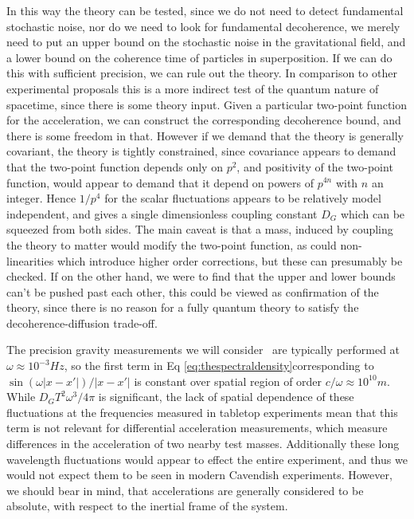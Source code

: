 \documentclass[aps,preprintnumbers,superscriptaddress,longbibliography]{revtex4-1}
\begin{document}
 In this way the theory can be tested, since we do not need to detect fundamental stochastic noise, nor do we need to look for fundamental decoherence, we merely need to put an upper bound on the stochastic noise in the gravitational field, and a lower bound on the coherence time of particles in superposition. If we can do this with sufficient precision, we can rule out the theory.
In comparison to other experimental proposals\cite{bose2017spin,marletto2017gravitationally} this is a more indirect test of the quantum nature of spacetime, since there is some theory input.
Given a particular two-point function for the acceleration, we can construct the corresponding decoherence bound, and there is some freedom in that. However if we demand that the theory is generally covariant, the theory is tightly constrained, since covariance appears to demand that the two-point function depends only on $p^2$, and positivity of the two-point function, would appear to demand that it depend on powers of $p^{4n}$ with $n$ an integer. Hence $1/p^4$ for the scalar fluctuations appears to be relatively model independent, and gives a single dimensionless coupling constant $D_G$ which can be squeezed from both sides. The main caveat is that a mass, induced by coupling the theory to matter would modify the two-point function, as could non-linearities which introduce higher order corrections, but these can presumably be checked.
 If on the other hand, we were to find that the upper and lower bounds can't be pushed past each other, this could be viewed as confirmation of the theory, since there is no reason for a fully quantum theory to satisfy the decoherence-diffusion trade-off.



The precision gravity measurements we will consider~\cite{hoyle2004submillimeter,carney2019tabletop,westphal2021measurement,fuchs2024measuring,janse2024current,armano2018beyond} are typically performed at $\omega \approx 10^{-3} \unit{Hz}$, so the  first term  in Eq \eqref{eq:thespectraldensity}corresponding to $\sin(\omega|x-x'|)/|x-x'|$ is constant over spatial region of order $c/\omega\approx 10^{10}\unit{m}$. While $D_G T^2\omega^3/4\pi$ is significant, the lack of spatial dependence of these fluctuations at the frequencies measured in tabletop experiments mean that this term is not relevant for differential acceleration measurements, which measure differences in the acceleration of two nearby test masses. Additionally these long wavelength fluctuations would appear to effect the entire experiment, and thus we would not expect them to be seen in modern Cavendish experiments. However, we should bear in mind, that accelerations are generally considered to be absolute, with respect to the inertial frame of the system\cite{mach1919science}.
\end{document}
